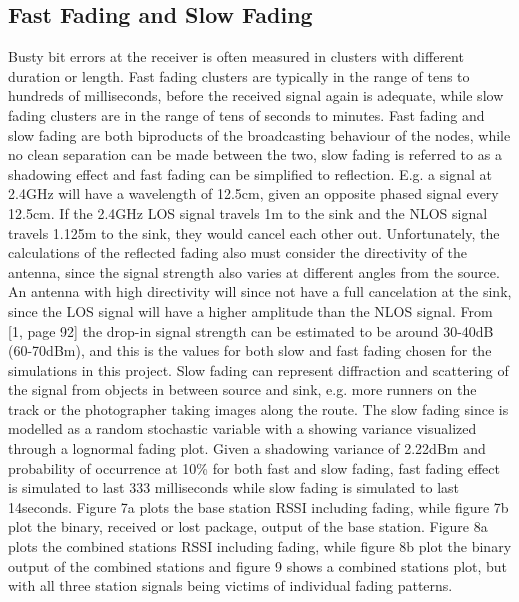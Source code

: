 \subsection{Fast Fading and Slow Fading}
Busty bit errors at the receiver is often measured in clusters with different duration or length. Fast fading clusters are typically in the range of tens to hundreds of milliseconds, before the received signal again is adequate, while slow fading clusters are in the range of tens of seconds to minutes. Fast fading and slow fading are both biproducts of the broadcasting behaviour of the nodes, while no clean separation can be made between the two, slow fading is referred to as a shadowing effect and fast fading can be simplified to reflection. E.g. a signal at 2.4GHz will have a wavelength of 12.5cm, given an opposite phased signal every 12.5cm. If the 2.4GHz LOS signal travels 1m to the sink and the NLOS signal travels 1.125m to the sink, they would cancel each other out. Unfortunately, the calculations of the reflected fading also must consider the directivity of the antenna, since the signal strength also varies at different angles from the source. An antenna with high directivity will since not have a full cancelation at the sink, since the LOS signal will have a higher amplitude than the NLOS signal. From [1, page 92] the drop-in signal strength can be estimated to be around 30-40dB (60-70dBm), and this is the values for both slow and fast fading chosen for the simulations in this project. Slow fading can represent diffraction and scattering of the signal from objects in between source and sink, e.g. more runners on the track or the photographer taking images along the route. The slow fading since is modelled as a random stochastic variable with a showing variance visualized through a lognormal fading plot. Given a shadowing variance of 2.22dBm and probability of occurrence at 10\% for both fast and slow fading, fast fading effect is simulated to last 333 milliseconds while slow fading is simulated to last 14seconds. Figure 7a plots the base station RSSI including fading, while figure 7b plot the binary, received or lost package, output of the base station. Figure 8a plots the combined stations RSSI including fading, while figure 8b plot the binary output of the combined stations and figure 9 shows a combined stations plot, but with all three station signals being victims of individual fading patterns.





